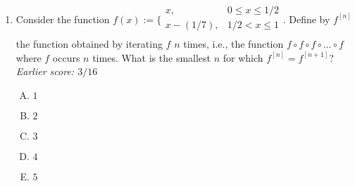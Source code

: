 \documentclass[10pt]{amsart}
\begin{document}
\begin{enumerate}
  \begin{enumerate}[(A)]
  \item It is at least $13$ and at most $15$.
  \item It is at least $13$, but we cannot put any upper bound on it
    based on the given information.
  \item It is at most $15$, but we cannot put any lower bound (other
  than the meaningless bound of $0$) based on the given information.
  \item It is at most $13$.
  \item It is at least $15$.
  \end{enumerate}

  {\em Answer}: Option (B)

  {\em Explanation}: Suppose the zeros of $f$ are $a_1 < a_2 < \dots <
  a_{14}$. By Rolle's theorem, there is {\em at least one} zero of
  $f'$ between each $a_i$ and $a_{i+1}$. There may be more, since
  Rolle's theorem gives only a {\em lower} bound. This gives thirteen
  solutions $c$ to $f'(c) = 0$.

  Note that in order to apply Rolle's theorem, it is enough to be
  given that $f$ is differentiable, so the additional hypothesis that
  $f'$ is continuous is not necessary.

  {\em Performance review}: $23$ out of $24$ got this. $1$ chose (A).

  {\em Historical note 1}: $12$ out of $20$ people got this
  correct. $4$ chose (A), $2$ chose (E), $1$ each chose (C) and (D).

  {\em Historical note 2}: In the last appearance in a 153 quiz, $19$
  out of $28$ people got this correct. $5$ people chose (A), $2$
  people chose (C), and $1$ person each chose (D) and (E).
\item Consider the function $f(x) := \lbrace\begin{array}{rl} x, & 0
  \le x \le 1/2 \\ x - (1/7), & 1/2 < x \le 1 \\\end{array}$. Define by
  $f^{[n]}$ the function obtained by iterating $f$ $n$ times, i.e.,
  the function $f \circ f \circ f \circ \dots \circ f$ where $f$
  occurs $n$ times. What is the smallest $n$ for which $f^{[n]} =
  f^{[n + 1]}$? {\em Earlier score: $3/16$}

  \begin{enumerate}[(A)]
  \item $1$
  \item $2$
  \item $3$
  \item $4$
  \item $5$
  \end{enumerate}


\end{enumerate}
\end{document}

